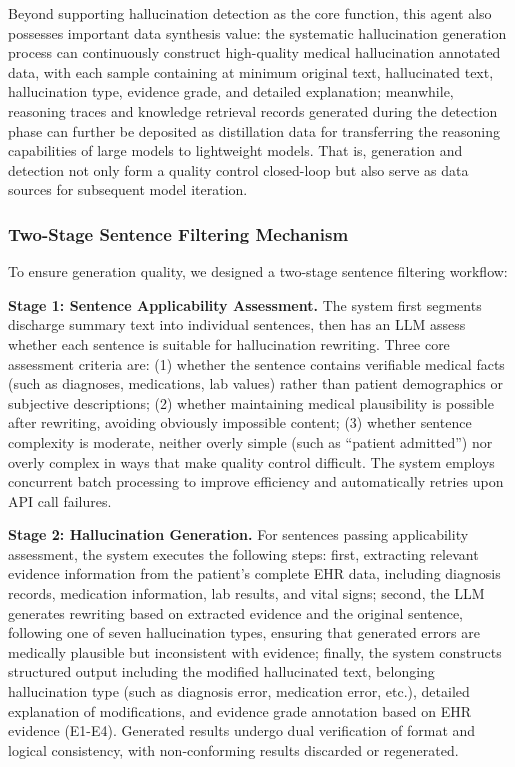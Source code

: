 \documentclass[11pt]{article}
\begin{document}
Beyond supporting hallucination detection as the core function, this agent also possesses important data synthesis value: the systematic hallucination generation process can continuously construct high-quality medical hallucination annotated data, with each sample containing at minimum original text, hallucinated text, hallucination type, evidence grade, and detailed explanation; meanwhile, reasoning traces and knowledge retrieval records generated during the detection phase can further be deposited as distillation data for transferring the reasoning capabilities of large models to lightweight models. That is, generation and detection not only form a quality control closed-loop but also serve as data sources for subsequent model iteration.

\subsubsection{Two-Stage Sentence Filtering Mechanism}

To ensure generation quality, we designed a two-stage sentence filtering workflow:

\textbf{Stage 1: Sentence Applicability Assessment.} The system first segments discharge summary text into individual sentences, then has an LLM assess whether each sentence is suitable for hallucination rewriting. Three core assessment criteria are: (1) whether the sentence contains verifiable medical facts (such as diagnoses, medications, lab values) rather than patient demographics or subjective descriptions; (2) whether maintaining medical plausibility is possible after rewriting, avoiding obviously impossible content; (3) whether sentence complexity is moderate, neither overly simple (such as ``patient admitted'') nor overly complex in ways that make quality control difficult. The system employs concurrent batch processing to improve efficiency and automatically retries upon API call failures.

\textbf{Stage 2: Hallucination Generation.} For sentences passing applicability assessment, the system executes the following steps: first, extracting relevant evidence information from the patient's complete EHR data, including diagnosis records, medication information, lab results, and vital signs; second, the LLM generates rewriting based on extracted evidence and the original sentence, following one of seven hallucination types, ensuring that generated errors are medically plausible but inconsistent with evidence; finally, the system constructs structured output including the modified hallucinated text, belonging hallucination type (such as diagnosis error, medication error, etc.), detailed explanation of modifications, and evidence grade annotation based on EHR evidence (E1-E4). Generated results undergo dual verification of format and logical consistency, with non-conforming results discarded or regenerated.
\end{document}
